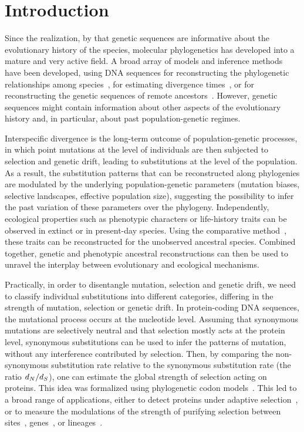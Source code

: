 \section{Introduction}
\label{sec:Introduction}

Since the realization, by \citet{Zuckerkandl1965} that genetic sequences are informative about the evolutionary history of the species, molecular phylogenetics has developed into a mature and very active field.
A broad array of models and inference methods have been developed, using {DNA} sequences for reconstructing the phylogenetic relationships among species~\citep{Felsenstein1981}, for estimating divergence times~\citep{Thorne2002}, or for reconstructing the genetic sequences of remote ancestors~\citep{Liberles2007}.
However, genetic sequences might contain information about other aspects of the evolutionary history and, in particular, about past population-genetic regimes.

Interspecific divergence is the long-term outcome of population-genetic processes, in which point mutations at the level of individuals are then subjected to selection and {genetic drift}, leading to substitutions at the level of the population.
As a result, the {substitution} patterns that can be reconstructed along phylogenies are modulated by the underlying population-genetic parameters (mutation biases, selective landscapes, effective population size), suggesting the possibility to infer the past variation of these parameters over the phylogeny.
Independently, ecological properties such as phenotypic characters or life-history traits can be observed in extinct or in present-day species.
Using the comparative method~\citep{Felsenstein1985}, these traits can be reconstructed for the unobserved ancestral species.
Combined together, genetic and phenotypic ancestral reconstructions can then be used to unravel the interplay between evolutionary and ecological mechanisms.

Practically, in order to disentangle mutation, selection and {genetic drift}, we need to classify individual substitutions into different categories, differing in the strength of mutation, selection or {genetic drift}.
In protein-coding {DNA} sequences, the mutational process occurs at the nucleotide level.
Assuming that {synonymous} mutations are selectively {neutral} and that selection mostly acts at the protein level, {synonymous} substitutions can be used to infer the patterns of mutation, without any interference contributed by selection.
Then, by comparing the {non-synonymous} {substitution} rate relative to the {synonymous} {substitution} rate (the ratio $d_N / d_S$), one can estimate the global strength of selection acting on proteins.
This idea was formalized using phylogenetic {codon} models~\citep{Muse1994,Goldman1994}.
This led to a broad range of applications, either to detect proteins under adaptive selection~\citep{Kosiol2008}, or to measure the modulations of the strength of purifying selection between sites~\citep{Echave2016}, genes~\citep{Zhang2015}, or lineages~\citep{Lartillot2011}.

